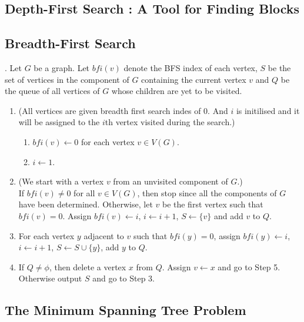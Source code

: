 \subsection{Depth-First Search : A Tool for Finding Blocks}

\subsection{Breadth-First Search}
\begin{algorithm}.
	Let $G$ be a graph. Let $bfi(v)$ denote the BFS index of each vertex, $S$ be the set of vertices in the component of $G$ containing the current vertex $v$ and $Q$ be the queue of all vertices of $G$ whose children are yet to be visited.
\begin{enumerate}
	\item (All vertices are given breadth first search indes of 0. And $i$ is initilised and it will be assigned to the $i$th vertex visited during the search.)
	\begin{enumerate}
	\item $bfi(v) \leftarrow 0$ for each vertex $v \in V(G)$.
	\item $i \leftarrow 1$.
	\end{enumerate}
	\item (We start with a vertex $v$ from an unvisited component of $G$.)\\
		If $bfi(v) \ne 0$ for all $v \in V(G)$, then stop since all the components of $G$ have been determined. Otherwise, let $v$ be the first vertex such that $bfi(v) = 0$. Assign $bfi(v) \leftarrow i$, $i \leftarrow i+1$, $S \leftarrow \{v\}$ and add $v$ to $Q$.
	\item For each vertex $y$ adjacent to $v$ such that $bfi(y) = 0$, assign $bfi(y) \leftarrow i$, $i \leftarrow i+1$, $S \leftarrow S \cup \{ y \}$, add $y$ to $Q$.
	\item If $Q \ne \phi$, then delete a vertex $x$ from $Q$. Assign $v \leftarrow x$ and go to Step 5. Otherwise output $S$ and go to Step 3.
\end{enumerate}
\end{algorithm}

\subsection{The Minimum Spanning Tree Problem}

